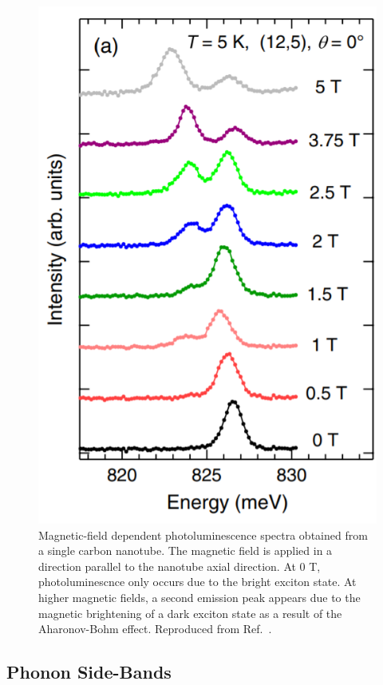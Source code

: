 \begin{figure}[ht]
	\centering
	\includegraphics[scale=0.5]{images/chapter_optical_props/dark_brightening_srivastava}
	\caption{Magnetic-field dependent photoluminescence spectra obtained from a single carbon nanotube. The magnetic field is applied in a direction parallel to the nanotube axial direction. At 0 T, photoluminescnce only occurs due to the bright exciton state. At higher magnetic fields, a second emission peak appears due to the magnetic brightening of a dark exciton state as a result of the Aharonov-Bohm effect.  Reproduced from Ref.\ \cite{srivastava2008direct}.}
	\label{fig:exciton_brightening}
\end{figure}


\subsection{Phonon Side-Bands}


